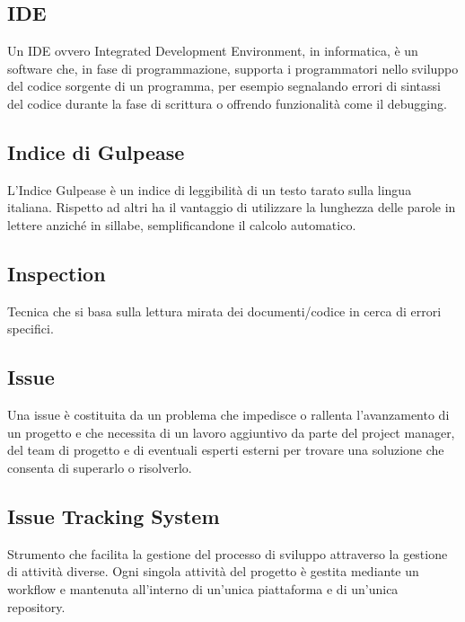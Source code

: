 
\subsection*{IDE}
Un IDE ovvero Integrated Development Environment, in informatica, è un software che, in fase di programmazione, supporta i programmatori nello sviluppo del codice sorgente di un programma, per esempio segnalando errori di sintassi del codice durante la fase di scrittura o offrendo funzionalità come il debugging.

\subsection*{Indice di Gulpease}
L'Indice Gulpease è un indice di leggibilità di un testo tarato sulla lingua italiana. Rispetto ad altri ha il vantaggio di utilizzare la lunghezza delle parole in lettere anziché in sillabe, semplificandone il calcolo automatico.

\subsection*{Inspection}
Tecnica che si basa sulla lettura mirata dei documenti/codice in cerca di errori specifici.

\subsection*{Issue}
Una issue è costituita da un problema che impedisce o rallenta l’avanzamento di un progetto e che necessita di un lavoro aggiuntivo da parte del project manager, del team di progetto e di eventuali esperti esterni per trovare una soluzione che consenta di superarlo o risolverlo.

\subsection*{Issue Tracking System}
Strumento che facilita la gestione del processo di sviluppo attraverso la gestione di attività diverse.
Ogni singola attività del progetto è gestita mediante un workflow e mantenuta all’interno di un’unica piattaforma e di un’unica repository.

